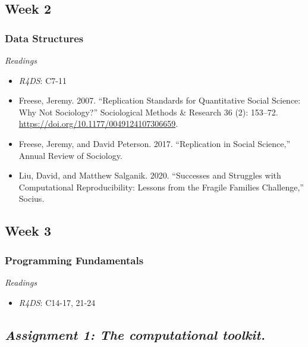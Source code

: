 \documentclass[
  10pt,
]{article}
\providecommand{\tightlist}{%
  \setlength{\itemsep}{0pt}\setlength{\parskip}{0pt}}
\begin{document}
\hypertarget{week-2}{%
\subsection{Week 2}\label{week-2}}

\hypertarget{data-structures}{%
\subsubsection{Data Structures}\label{data-structures}}

\emph{Readings}

\begin{itemize}
\tightlist
\item
  \emph{R4DS}: C7-11
\item
  Freese, Jeremy. 2007. ``Replication Standards for Quantitative Social
  Science: Why Not Sociology?'' Sociological Methods \& Research 36 (2):
  153--72. \url{https://doi.org/10.1177/0049124107306659}.
\item
  Freese, Jeremy, and David Peterson. 2017. ``Replication in Social
  Science,'' Annual Review of Sociology.
\item
  Liu, David, and Matthew Salganik. 2020. ``Successes and Struggles with
  Computational Reproducibility: Lessons from the Fragile Families
  Challenge,'' Socius.
\end{itemize}

\hypertarget{week-3}{%
\subsection{Week 3}\label{week-3}}

\hypertarget{programming-fundamentals}{%
\subsubsection{Programming
Fundamentals}\label{programming-fundamentals}}

\emph{Readings}

\begin{itemize}
\tightlist
\item
  \emph{R4DS}: C14-17, 21-24
\end{itemize}

\hypertarget{assignment-1-the-computational-toolkit.}{%
\subsection{\texorpdfstring{\emph{Assignment 1: The computational
toolkit.}}{Assignment 1: The computational toolkit.}}\label{assignment-1-the-computational-toolkit.}}
\end{document}
